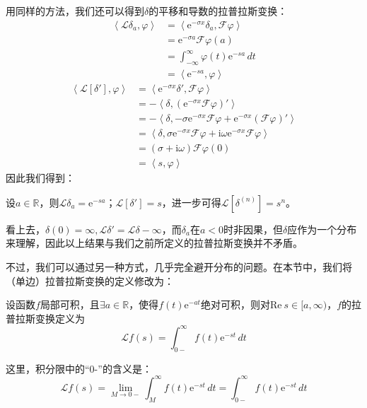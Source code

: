\documentclass{ctexbook}
\begin{document}
用同样的方法，我们还可以得到$\delta$的平移和导数的拉普拉斯变换：
\begin{align*}
    \left\langle \mathcal{L}\delta_a,\varphi\right\rangle&=\left\langle \mathrm{e}^{-\sigma x}\delta_a,\mathcal{F} \varphi\right\rangle\\
    &=\mathrm{e}^{-\sigma a}\mathcal{F}\varphi(a)\\
    &=\int_{-\infty}^{\infty}\varphi(t)\mathrm{e}^{-s a}\,dt\\
    &=\left\langle \mathrm{e}^{-s a},\varphi\right\rangle
\end{align*}
\begin{align*}
    \left\langle \mathcal{L}\left[\delta'\right],\varphi\right\rangle&=\left\langle \mathrm{e}^{-\sigma x}\delta',\mathcal{F} \varphi\right\rangle\\
    &=-\left\langle \delta,\left(\mathrm{e}^{-\sigma x}\mathcal{F} \varphi\right)'\right\rangle\\
    &=-\left\langle \delta,-\sigma \mathrm{e}^{-\sigma x}\mathcal{F} \varphi + \mathrm{e}^{-\sigma x}(\mathcal{F} \varphi)'\right\rangle\\
    &=\left\langle \delta,\sigma \mathrm{e}^{-\sigma x}\mathcal{F} \varphi + \mathrm{i}\omega \mathrm{e}^{-\sigma x}\mathcal{F} \varphi\right\rangle\\
    &=(\sigma + \mathrm{i}\omega)\mathcal{F} \varphi(0)\\
    &=\left\langle s,\varphi\right\rangle
\end{align*}
因此我们得到：
\begin{proposition}
    设$a\in\mathbb{R}$，则$\mathcal{L} \delta_a=\mathrm{e}^{-s a}$；$\mathcal{L} \left[\delta'\right]=s$，进一步可得$\mathcal{L} \left[\delta^{(n)}\right]=s^n$。
\end{proposition}

看上去，$\delta(0)=\infty,\mathcal{L} \delta'=\mathcal{L} \delta-\infty$，而$\delta_a$在$a<0$时非因果，但$\delta$应作为一个分布来理解，因此以上结果与我们之前所定义的拉普拉斯变换并不矛盾。

不过，我们可以通过另一种方式，几乎完全避开分布的问题。在本节中，我们将（单边）拉普拉斯变换的定义修改为：
\begin{definition}
    设函数$f$局部可积，且$\exists a\in\mathbb{R}$，使得$f(t)\mathrm{e}^{-at}$绝对可积，则对$\text{Re}\ s\in[a,\infty)$，$f$的拉普拉斯变换定义为
    \[\mathcal{L} f(s)=\int_{0-}^{\infty}f(t)\mathrm{e}^{-st}\,dt\]
\end{definition}
这里，积分限中的“0-”的含义是：
\[\mathcal{L} f(s)=\lim_{M\to 0-}\int_{M}^{\infty}f(t)\mathrm{e}^{-st}\,dt=\int_{0-}^{\infty}f(t)\mathrm{e}^{-st}\,dt\]
\end{document}
